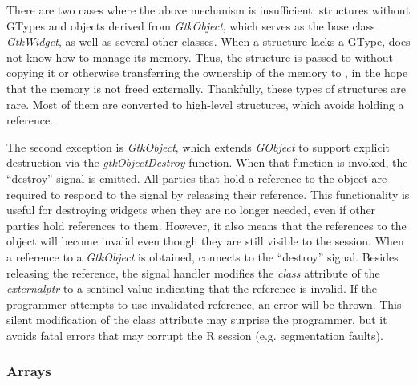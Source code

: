 \documentclass[article]{jss}
\begin{document}
There are two cases where the above mechanism is insufficient: 
structures without GTypes and objects derived from \emph{GtkObject}, which serves as the base class \emph{GtkWidget}, as well as several other  classes.
When a structure lacks a GType,  does not know how to
manage its memory. 
Thus, the structure is passed to  without copying it or
otherwise
transferring the ownership of the memory to , in the hope
that the
memory is not freed externally. Thankfully, these types of structures
are rare.
Most of them are converted to high-level 
structures, 
which avoids holding a reference. 

The second exception is \emph{GtkObject}, which
extends \emph{GObject} to support explicit destruction via the 
\emph{gtkObjectDestroy} function. When that function is invoked, the
``destroy''
signal is emitted. All parties that hold a reference to the object are
required
to respond to the signal by releasing their reference. This
functionality is 
useful for destroying widgets when they are no longer needed, even if
other 
parties hold references to them. However, it also means that the
references to the object will become invalid even though they are
still
visible to the  session. When a reference to a
\emph{GtkObject} is
obtained,  connects to the ``destroy'' signal.  Besides
releasing
the reference, the signal handler modifies the \emph{class} attribute
of the 
\emph{externalptr} to a sentinel value indicating that the reference
is invalid.
If the programmer attempts to use invalidated reference, an error will
be thrown.
This silent modification of the class attribute may surprise the
programmer, but it avoids fatal errors that may corrupt the R session
(e.g. segmentation faults).

\subsubsection{Arrays}
\end{document}
